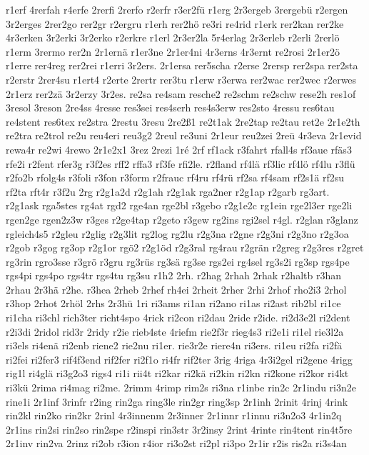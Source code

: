 {r1erf
4rerfah
r4erfe
2rerfi
2rerfo
r2erfr
r3er2fü
r1erg
2r3ergeb
3rergebü
r2ergen
3r2erges
2rer2go
rer2gr
r2ergru
r1erh
rer2hö
re3ri
re4rid
r1erk
rer2kan
rer2ke
4r3erken
3r2erki
3r2erko
r2erkre
r1erl
2r3er2la
5r4erlag
2r3erleb
r2erli
2rerlö
r1erm
3rermo
rer2n
2r1ernä
r1er3ne
2r1er4ni
4r3erns
4r3ernt
re2rosi
2r1er2ö
r1erre
rer4reg
rer2rei
r1erri
3r2ers.
2r1ersa
rer5scha
r2erse
2rersp
rer2spa
rer2sta
r2erstr
2rer4su
r1ert4
r2erte
2rertr
rer3tu
r1erw
r3erwa
rer2wac
rer2wec
r2erwes
2r1erz
rer2zä
3r2erzy
3r2es.
re2sa
re4sam
resche2
re2schm
re2schw
rese2h
res1of
3resol
3reson
2re4ss
4resse
res3sei
res4serh
res4s3erw
res2sto
4ressu
res6tau
re4stent
res6tex
re2stra
2restu
3resu
2re2ß1
re2t1ak
2re2tap
re2tau
ret2e
2r1e2th
re2tra
re2trol
re2u
reu4eri
reu3g2
2reul
re3uni
2r1eur
reu2zei
2reü
4r3eva
2r1evid
rewa4r
re2wi
4rewo
2r1e2x1
3rez
2rezi
1ré
2rf
rf1ack
r3fahrt
rfall4s
rf3aue
rfäs3
rfe2i
r2fent
rfer3g
r3f2es
rff2
rffa3
rf3fe
rfi2le.
r2fland
rf4lä
rf3lic
rf4lö
rf4lu
r3flü
r2fo2b
rfolg4s
r3foli
r3fon
r3form
r2frauc
rf4ru
rf4rü
rf2sa
rf4sam
rf2s1ä
rf2su
rf2ta
rft4r
r3f2u
2rg
r2g1a2d
r2g1ah
r2g1ak
rga2ner
r2g1ap
r2garb
rg3art.
r2g1ask
rga5stes
rg4at
rgd2
rge4an
rge2bl
r3gebo
r2g1e2c
rg1ein
rge2l3er
rge2li
rgen2ge
rgen2z3w
r3ges
r2ge4tap
r2geto
r3gew
rg2ins
rgi2sel
r4gl.
r2glan
r3glanz
rgleich4s5
r2gleu
r2glig
r2g3lit
rg2log
rg2lu
r2g3na
r2gne
r2g3ni
r2g3no
r2g3oa
r2gob
r3gog
rg3op
r2g1or
rgö2
r2g1öd
r2g3ral
rg4rau
r2grän
r2greg
r2g3res
r2gret
rg3rin
rgro3sse
r3grö
r3gru
rg3rüs
rg3sä
rg3se
rgs2ei
rg4sel
rg3s2i
rg3sp
rgs4pe
rgs4pi
rgs4po
rgs4tr
rgs4tu
rg3su
r1h2
2rh.
r2hag
2rhah
2rhak
r2haltb
r3han
2rhau
2r3hä
r2he.
r3hea
2rheb
2rhef
rh4ei
2rheit
2rher
2rhi
2rhof
rho2i3
2rhol
r3hop
2rhot
2rhöl
2rhs
2r3hü
1ri
ri3ams
ri1an
ri2ano
ri1as
ri2ast
rib2bl
ri1ce
ri1cha
ri3chl
rich3ter
richt4spo
4rick
ri2con
ri2dau
2ride
r2ide.
ri2d3e2l
ri2dent
r2i3di
2ridol
rid3r
2ridy
r2ie
rieb4ste
4riefm
rie2f3r
rieg4s3
ri2e1i
ri1el
rie3l2a
ri3els
ri4enä
ri2enb
riene2
rie2nu
ri1er.
rie3r2e
riere4n
ri3ers.
ri1eu
ri2fa
ri2fä
ri2fei
ri2fer3
rif4f3end
rif2fer
ri2f1o
ri4fr
rif2ter
3rig
4riga
4r3i2gel
ri2gene
4rigg
rig1l
ri4glä
ri3g2o3
rigs4
ri1i
rii4t
ri2kar
ri2kä
ri2kin
ri2kn
ri2kone
ri2kor
ri4kt
ri3kü
2rima
ri4mag
ri2me.
2rimm
4rimp
rim2s
ri3na
r1inbe
rin2c
2r1indu
ri3n2e
rine1i
2r1inf
3rinfr
r2ing
rin2ga
ring3le
rin2gr
ring3sp
2r1inh
2rinit
4rinj
4rink
rin2kl
rin2ko
rin2kr
2rinl
4r3innenm
2r3inner
2r1innr
r1innu
ri3n2o3
4r1in2q
2r1ins
rin2si
rin2so
rin2spe
r2inspi
rin3str
3r2insy
2rint
4rinte
rin4tent
rin4t5re
2r1inv
rin2va
2rinz
ri2ob
r3ion
r4ior
ri3o2st
ri2pl
ri3po
2r1ir
r2is
ris2a
ri3s4an
}
